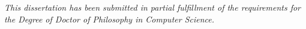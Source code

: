
\vspace*{\fill}
\vspace*{\fill}
\vspace*{\fill}
\begin{center}
\textit{
This dissertation has been submitted in partial fulfillment of
the requirements for the Degree of Doctor of Philosophy in
Computer Science.
}
\end{center}

\vspace*{\fill}
\vspace*{\fill}
\vspace*{\fill}
